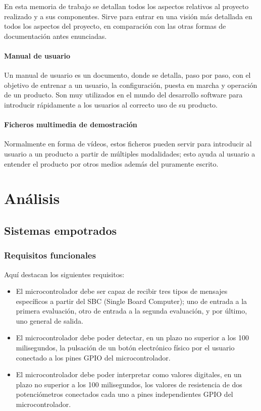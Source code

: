 \documentclass[12pt,a4paper,twoside,openright]{book}
\begin{document}
En esta memoria de trabajo se detallan todos los aspectos relativos al proyecto realizado y a sus componentes. Sirve para entrar en una visión más detallada en todos los aspectos del proyecto, en comparación con las otras formas de documentación antes enunciadas.

\subsubsection{Manual de usuario}

Un manual de usuario es un documento, donde se detalla, paso por paso, con el objetivo de entrenar a un usuario, la configuración, puesta en marcha y operación de un producto. Son muy utilizados en el mundo del desarrollo software para introducir rápidamente a los usuarios al correcto uso de su producto.

\subsubsection{Ficheros multimedia de demostración}

Normalmente en forma de vídeos, estos ficheros pueden servir para introducir al usuario a un producto a partir de múltiples modalidades; esto ayuda al usuario a entender el producto por otros medios además del puramente escrito.


\chapter{Análisis}

\section{Sistemas empotrados}

\subsection{Requisitos funcionales}

Aquí destacan los siguientes requisitos:

\begin{itemize}
\item [RF1] El microcontrolador debe ser capaz de recibir tres tipos de mensajes específicos a partir del SBC (Single Board Computer); uno de entrada a la primera evaluación, otro de entrada a la segunda evaluación, y por último, uno general de salida.
\item [RF2] El microcontrolador debe poder detectar, en un plazo no superior a los 100 milisegundos, la pulsación de un botón electrónico físico por el usuario conectado a los pines GPIO del microcontrolador.
\item [RF3] El microcontrolador debe poder interpretar como valores digitales, en un plazo no superior a los 100 milisegundos, los valores de resistencia de dos potenciómetros conectados cada uno a pines independientes GPIO del microcontrolador.
\end{itemize}
\end{document}

